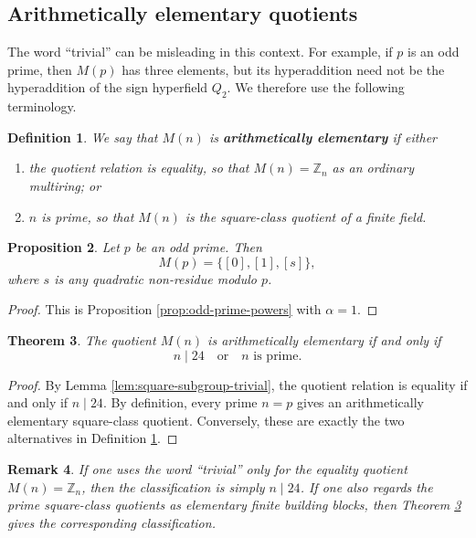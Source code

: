 \documentclass[a4paper,10pt]{article}
\newtheorem{teo}{Theorem}[section]
\newtheorem{prop}[teo]{Proposition}
\newtheorem{defn}[teo]{Definition}
\newtheorem{rem}[teo]{Remark}
\newcommand{\cl}[1]{\left[#1\right]}
\begin{document}
\subsection{Arithmetically elementary quotients}

The word ``trivial'' can be misleading in this context.  For example, if $p$ is an odd prime, then $M(p)$ has three elements, but its hyperaddition need not be the hyperaddition of the sign hyperfield $Q_2$.  We therefore use the following terminology.

\begin{defn}\label{defn:arith-elementary}
We say that $M(n)$ is \textbf{arithmetically elementary} if either
\begin{enumerate}[i -]
    \item the quotient relation is equality, so that $M(n)=\mathbb Z_n$ as an ordinary multiring; or
    \item $n$ is prime, so that $M(n)$ is the square-class quotient of a finite field.
\end{enumerate}
\end{defn}

\begin{prop}\label{prop:prime-case}
Let $p$ be an odd prime.  Then
\[
        M(p)=\{\cl0,\cl1,\cl s\},
\]
where $s$ is any quadratic non-residue modulo $p$.
\end{prop}

\begin{proof}
This is Proposition \ref{prop:odd-prime-powers} with $\alpha=1$.
\end{proof}

\begin{teo}\label{teo:arith-elementary}
The quotient $M(n)$ is arithmetically elementary if and only if
\[
        n\mid24
        \quad\mbox{or}\quad
        n\mbox{ is prime}.
\]
\end{teo}

\begin{proof}
By Lemma \ref{lem:square-subgroup-trivial}, the quotient relation is equality if and only if $n\mid24$.  By definition, every prime $n=p$ gives an arithmetically elementary square-class quotient.  Conversely, these are exactly the two alternatives in Definition \ref{defn:arith-elementary}.
\end{proof}

\begin{rem}
If one uses the word ``trivial'' only for the equality quotient $M(n)=\mathbb Z_n$, then the classification is simply $n\mid24$.  If one also regards the prime square-class quotients as elementary finite building blocks, then Theorem \ref{teo:arith-elementary} gives the corresponding classification.
\end{rem}
\end{document}
